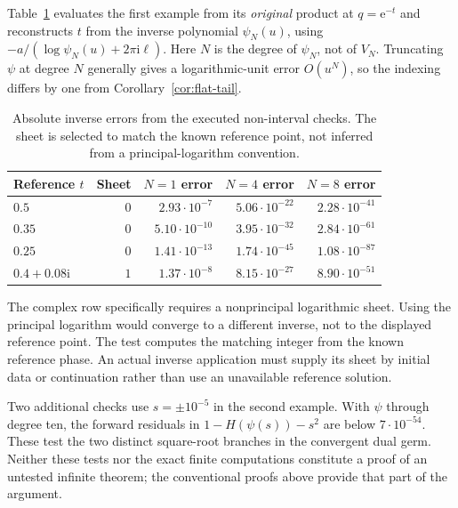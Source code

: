 \documentclass[11pt,a4paper]{article}
\numberwithin{equation}{section}
\theoremstyle{definition}\newtheorem{definition}[theorem]{Definition}
\theoremstyle{remark}\newtheorem{remark}[theorem]{Remark}
\newcommand{\ii}{\mathrm i}\newcommand{\e}{\mathrm e}
\begin{document}
Table~\ref{tab:inverse} evaluates the first example from its
\emph{original} product at $q=\e^{-t}$ and reconstructs $t$ from the
inverse polynomial $\psi_N(u)$, using
$-a/(\log\psi_N(u)+2\pi\ii\ell)$. Here $N$ is the degree of $\psi_N$,
not of $V_N$. Truncating $\psi$ at degree $N$ generally gives a
logarithmic-unit error $O(u^N)$, so the indexing differs by one from
Corollary~\ref{cor:flat-tail}.
\begin{table}[htbp]
\centering\small
\begin{tabular}{@{}lrrrr@{}}
\toprule
Reference $t$ & Sheet & $N=1$ error & $N=4$ error & $N=8$ error\\
\midrule
$0.5$ & $0$ & $2.93\cdot10^{-7}$ & $5.06\cdot10^{-22}$ & $2.28\cdot10^{-41}$\\
$0.35$ & $0$ & $5.10\cdot10^{-10}$ & $3.95\cdot10^{-32}$ & $2.84\cdot10^{-61}$\\
$0.25$ & $0$ & $1.41\cdot10^{-13}$ & $1.74\cdot10^{-45}$ & $1.08\cdot10^{-87}$\\
$0.4+0.08\ii$ & $1$ & $1.37\cdot10^{-8}$ & $8.15\cdot10^{-27}$ & $8.90\cdot10^{-51}$\\
\bottomrule
\end{tabular}
\caption{Absolute inverse errors from the executed non-interval checks.
The sheet is selected to match the known reference point, not inferred
from a principal-logarithm convention.}
\label{tab:inverse}
\end{table}
The complex row specifically requires a nonprincipal logarithmic sheet.
Using the principal logarithm would converge to a different inverse,
not to the displayed reference point. The test computes the matching
integer from the known reference phase. An actual inverse application
must supply its sheet by initial data or continuation rather than use
an unavailable reference solution.

Two additional checks use $s=\pm10^{-5}$ in the second example. With
$\psi$ through degree ten, the forward residuals in $1-H(\psi(s))-s^2$
are below $7\cdot10^{-54}$. These test the two distinct square-root
branches in the convergent dual germ. Neither these tests nor the exact
finite computations constitute a proof of an untested infinite theorem;
the conventional proofs above provide that part of the argument.
\end{document}
